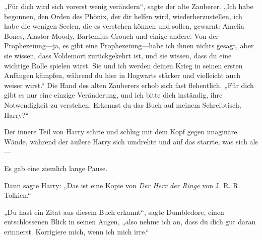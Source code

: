 „Für dich wird sich vorerst wenig verändern“, sagte der alte Zauberer.
„Ich habe begonnen, den Orden des Phönix, der dir helfen wird, wiederherzustellen, ich habe die wenigen Seelen, die es verstehen können und sollen, gewarnt: Amelia Bones, Alastor Moody, Bartemius Crouch und einige andere. Von der Prophezeiung—ja, es gibt eine Prophezeiung—habe ich ihnen nichts gesagt, aber sie wissen, dass Voldemort zurückgekehrt ist, und sie wissen, dass du eine wichtige Rolle spielen wirst. Sie und ich werden deinen Krieg in seinen ersten Anfängen kämpfen, während du hier in Hogwarts stärker und vielleicht auch weiser wirst.“ Die Hand des alten Zauberers erhob sich fast flehentlich.
„Für dich gibt es nur eine einzige Veränderung, und ich bitte dich inständig, ihre Notwendigkeit zu verstehen. Erkennst du das Buch auf meinem Schreibtisch, Harry?“

Der innere Teil von Harry schrie und schlug mit dem Kopf gegen imaginäre Wände, während der äußere Harry sich umdrehte und auf das starrte, was sich als—

Es gab eine ziemlich lange Pause.

Dann sagte Harry:
„Das ist eine Kopie von \emph{Der Herr der Ringe} von J. R. R. Tolkien.“

„Du hast ein Zitat aus diesem Buch erkannt“, sagte Dumbledore, einen entschlossenen Blick in seinen Augen, „also nehme ich an, dass du dich gut daran erinnerst. Korrigiere mich, wenn ich mich irre.“

